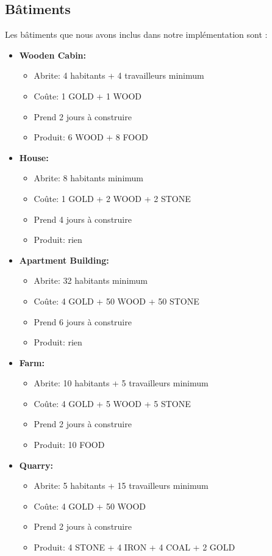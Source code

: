 \documentclass[a4paper,11pt]{article}
\begin{document}
\subsection{Bâtiments}
Les bâtiments que nous avons inclus dans notre implémentation sont :

\begin{itemize}
	\item \textbf{Wooden Cabin:}
	      \begin{itemize}
		      \item Abrite: 4 habitants + 4 travailleurs minimum
		      \item Coûte: 1 GOLD + 1 WOOD
		      \item Prend 2 jours à construire
		      \item Produit: 6 WOOD + 8 FOOD
	      \end{itemize}

	\item \textbf{House:}
	      \begin{itemize}
		      \item Abrite: 8 habitants minimum
		      \item Coûte: 1 GOLD + 2 WOOD + 2 STONE
		      \item Prend 4 jours à construire
		      \item Produit: rien
	      \end{itemize}

	\item \textbf{Apartment Building:}
	      \begin{itemize}
		      \item Abrite: 32 habitants minimum
		      \item Coûte: 4 GOLD + 50 WOOD + 50 STONE
		      \item Prend 6 jours à construire
		      \item Produit: rien
	      \end{itemize}

	\item \textbf{Farm:}
	      \begin{itemize}
		      \item Abrite: 10 habitants + 5 travailleurs minimum
		      \item Coûte: 4 GOLD + 5 WOOD + 5 STONE
		      \item Prend 2 jours à construire
		      \item Produit: 10 FOOD
	      \end{itemize}

	\item \textbf{Quarry:}
	      \begin{itemize}
		      \item Abrite: 5 habitants + 15 travailleurs minimum
		      \item Coûte: 4 GOLD + 50 WOOD
		      \item Prend 2 jours à construire
		      \item Produit: 4 STONE + 4 IRON + 4 COAL + 2 GOLD
	      \end{itemize}


\end{itemize}
\end{document}
